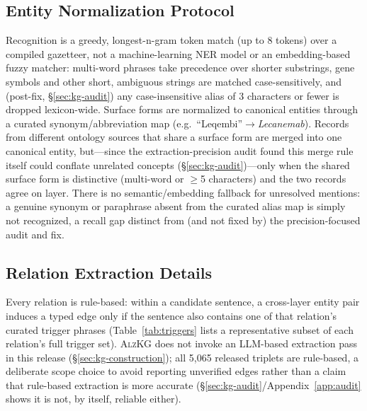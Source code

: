 \documentclass{article}
\begin{document}
\subsection{Entity Normalization Protocol}
\label{app:entity-norm}
Recognition is a greedy, longest-n-gram token match (up to 8 tokens) over a compiled gazetteer, not a machine-learning NER model or an embedding-based fuzzy matcher: multi-word phrases take precedence over shorter substrings, gene symbols and other short, ambiguous strings are matched case-sensitively, and (post-fix, \S\ref{sec:kg-audit}) any case-insensitive alias of 3 characters or fewer is dropped lexicon-wide. Surface forms are normalized to canonical entities through a curated synonym/abbreviation map (e.g.\ ``Leqembi''$\to$\emph{Lecanemab}). Records from different ontology sources that share a surface form are merged into one canonical entity, but---since the extraction-precision audit found this merge rule itself could conflate unrelated concepts (\S\ref{sec:kg-audit})---only when the shared surface form is distinctive (multi-word or $\geq$5 characters) and the two records agree on layer. There is no semantic/embedding fallback for unresolved mentions: a genuine synonym or paraphrase absent from the curated alias map is simply not recognized, a recall gap distinct from (and not fixed by) the precision-focused audit and fix.

\subsection{Relation Extraction Details}
\label{app:relation-extraction}
Every relation is rule-based: within a candidate sentence, a cross-layer entity pair induces a typed edge only if the sentence also contains one of that relation's curated trigger phrases (Table~\ref{tab:triggers} lists a representative subset of each relation's full trigger set). \textsc{AlzKG} does not invoke an LLM-based extraction pass in this release (\S\ref{sec:kg-construction}); all 5{,}065 released triplets are rule-based, a deliberate scope choice to avoid reporting unverified edges rather than a claim that rule-based extraction is more accurate (\S\ref{sec:kg-audit}/Appendix~\ref{app:audit} shows it is not, by itself, reliable either).
\end{document}

